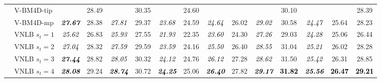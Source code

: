 \documentclass[10pt, a4paper]{article}
\newcommand{\bsic}[1]{\textcolor{black}{\textit{#1}}}
\newcommand{\Bsic}[1]{\textcolor{black}{\textbf{\textit{#1}}}}
\newcommand{\Best}[1]{\textbf{\textcolor{black}{#1}}}
\begin{document}
\begin{landscape}
\begin{table}[htp!]
\begin{center}
{\begin{tabular}{ c | l |c c | c c | c c | c c | c c | c c | c }
			                      & V-BM4D-tip           & \bsic{     } &       28.49  & \bsic{     } &       30.35   & \bsic{     } &       24.60   &              &              &              &       30.10   &              &              &       28.39  \\
			                      & V-BM4D-mp            & \Bsic{27.67} &       28.38  & \bsic{27.81} &       29.37   & \bsic{23.68} &       24.59   & \bsic{24.64} &       26.02  & \bsic{29.02} &       30.58   & \bsic{24.47} &       25.64  &       28.23  \\
			                      & VNLB   $s_t = 1$     & \bsic{25.62} &       26.83  & \bsic{25.93} &       27.55   & \bsic{21.93} &       22.35   & \bsic{23.60} &       24.30  & \bsic{27.26} &       29.03   & \bsic{24.28} &       25.06  &       26.44  \\
			                      & VNLB   $s_t = 2$     & \bsic{27.04} &       28.32  & \bsic{27.59} &       29.59   & \bsic{23.59} &       24.16   & \bsic{25.50} &       26.40  & \bsic{28.55} &       31.04   & \bsic{25.21} &       26.02  &       28.28  \\
			                      & VNLB   $s_t = 3$     & \Bsic{27.44} &       28.82  & \bsic{28.05} &       30.32   & \bsic{24.12} &       24.76   & \bsic{26.12} &       27.28  & \bsic{28.62} &       31.50   & \bsic{25.42} &       26.31  &       28.85  \\
			                      & VNLB   $s_t = 4$     & \Bsic{28.08} &       29.24  & \Bsic{28.74} &       30.72   & \Bsic{24.25} &       25.06   & \Bsic{26.40} &       27.82  & \Bsic{29.17} & \Best{31.82}  & \Bsic{25.56} & \Best{26.47} & \Best{29.21} \\\hline

\end{tabular}}
\end{center}
\end{table}
\end{landscape}
\end{document}
